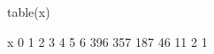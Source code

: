 \begin{Schunk}
\begin{Sinput}
  table(x)
\end{Sinput}
\begin{Soutput}
x
  0   1   2   3   4   5   6 
396 357 187  46  11   2   1 
\end{Soutput}
\end{Schunk}

